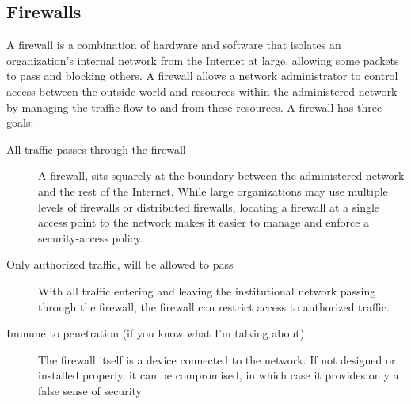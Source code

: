 \documentclass{article}
\begin{document}
\subsection*{Firewalls}
A firewall is a combination of hardware and software that isolates an organization’s
internal network from the Internet at large, allowing some packets to pass and blocking
others. A firewall allows a network administrator to control access between the
outside world and resources within the administered network by managing the traffic
flow to and from these resources. A firewall has three goals:
\begin{description}
    \item[All traffic passes through the firewall] A firewall, sits squarely at the boundary between the administered network and the rest of the Internet. While large organizations may use multiple levels of firewalls or distributed firewalls, locating a firewall at a single access point to the network makes it easier to manage and enforce a security-access policy.
    \item[Only authorized traffic, will be allowed to pass] With all traffic entering and leaving the       institutional network passing through the firewall, the firewall can restrict access to authorized      traffic.
    \item[Immune to penetration (if you know what I'm talking about)] The firewall itself is a device       connected to the network. If not designed or installed properly, it can be compromised, in which case it provides only a false sense of security
\end{description}
\end{document}
